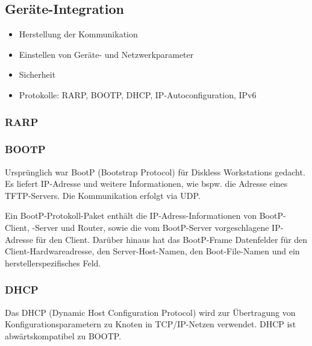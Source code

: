 \documentclass{article} %
\begin{document}
	
\subsection{Geräte-Integration}	
	\begin{itemize}
	\item Herstellung der Kommunikation 
	\item Einstellen von Geräte- und Netzwerkparameter 
	\item Sicherheit 
	\item Protokolle: RARP, BOOTP, DHCP, IP-Autoconfiguration, IPv6 
	\end{itemize}
\subsubsection{RARP}


\subsubsection{BOOTP}
Ursprünglich war BootP (Bootstrap Protocol) für Diskless Workstations gedacht. Es liefert IP-Adresse und weitere Informationen, wie bspw. die Adresse eines TFTP-Servers. Die Kommunikation erfolgt via UDP.

Ein BootP-Protokoll-Paket enthält die IP-Adress-Informationen von BootP-Client, -Server und Router, sowie die vom BootP-Server vorgeschlagene IP-Adresse für den Client. Darüber hinaus hat das BootP-Frame Datenfelder für den Client-Hardwareadresse, den Server-Host-Namen, den Boot-File-Namen und ein herstellerspezifisches Feld.  


\subsubsection{DHCP}
	Das DHCP (Dynamic Host Configuration Protocol) wird zur  Übertragung von Konfigurationsparametern zu Knoten in TCP/IP-Netzen verwendet. DHCP ist abwärtskompatibel zu BOOTP.\\
	
\end{document}
